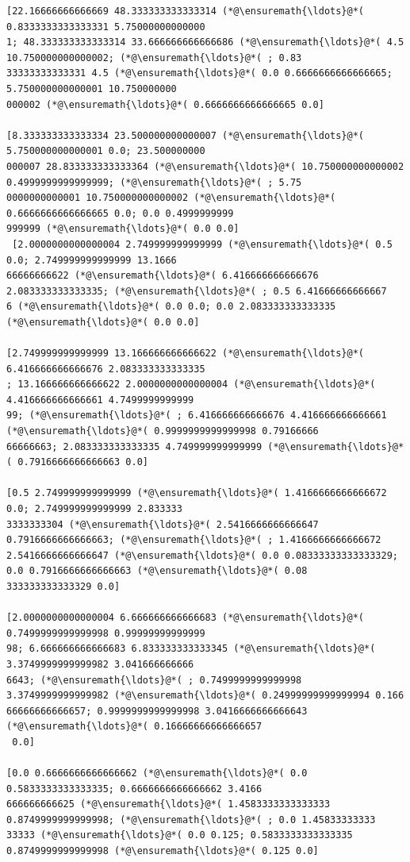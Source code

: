 \documentclass[12pt,a4paper]{article}
\begin{document}
\begin{lstlisting}
[22.16666666666669 48.333333333333314 (*@\ensuremath{\ldots}@*( 0.8333333333333331 5.75000000000000
1; 48.333333333333314 33.666666666666686 (*@\ensuremath{\ldots}@*( 4.5 10.750000000000002; (*@\ensuremath{\ldots}@*( ; 0.83
33333333333331 4.5 (*@\ensuremath{\ldots}@*( 0.0 0.6666666666666665; 5.750000000000001 10.750000000
000002 (*@\ensuremath{\ldots}@*( 0.6666666666666665 0.0]

[8.333333333333334 23.500000000000007 (*@\ensuremath{\ldots}@*( 5.750000000000001 0.0; 23.500000000
000007 28.833333333333364 (*@\ensuremath{\ldots}@*( 10.750000000000002 0.4999999999999999; (*@\ensuremath{\ldots}@*( ; 5.75
0000000000001 10.750000000000002 (*@\ensuremath{\ldots}@*( 0.6666666666666665 0.0; 0.0 0.4999999999
999999 (*@\ensuremath{\ldots}@*( 0.0 0.0]
 [2.0000000000000004 2.749999999999999 (*@\ensuremath{\ldots}@*( 0.5 0.0; 2.749999999999999 13.1666
66666666622 (*@\ensuremath{\ldots}@*( 6.416666666666676 2.083333333333335; (*@\ensuremath{\ldots}@*( ; 0.5 6.41666666666667
6 (*@\ensuremath{\ldots}@*( 0.0 0.0; 0.0 2.083333333333335 (*@\ensuremath{\ldots}@*( 0.0 0.0]

[2.749999999999999 13.166666666666622 (*@\ensuremath{\ldots}@*( 6.416666666666676 2.083333333333335
; 13.166666666666622 2.0000000000000004 (*@\ensuremath{\ldots}@*( 4.416666666666661 4.7499999999999
99; (*@\ensuremath{\ldots}@*( ; 6.416666666666676 4.416666666666661 (*@\ensuremath{\ldots}@*( 0.9999999999999998 0.79166666
66666663; 2.083333333333335 4.749999999999999 (*@\ensuremath{\ldots}@*( 0.7916666666666663 0.0]

[0.5 2.749999999999999 (*@\ensuremath{\ldots}@*( 1.4166666666666672 0.0; 2.749999999999999 2.833333
3333333304 (*@\ensuremath{\ldots}@*( 2.5416666666666647 0.7916666666666663; (*@\ensuremath{\ldots}@*( ; 1.4166666666666672 
2.5416666666666647 (*@\ensuremath{\ldots}@*( 0.0 0.08333333333333329; 0.0 0.7916666666666663 (*@\ensuremath{\ldots}@*( 0.08
333333333333329 0.0]

[2.0000000000000004 6.666666666666683 (*@\ensuremath{\ldots}@*( 0.7499999999999998 0.99999999999999
98; 6.666666666666683 6.833333333333345 (*@\ensuremath{\ldots}@*( 3.3749999999999982 3.041666666666
6643; (*@\ensuremath{\ldots}@*( ; 0.7499999999999998 3.3749999999999982 (*@\ensuremath{\ldots}@*( 0.24999999999999994 0.166
66666666666657; 0.9999999999999998 3.0416666666666643 (*@\ensuremath{\ldots}@*( 0.16666666666666657
 0.0]

[0.0 0.6666666666666662 (*@\ensuremath{\ldots}@*( 0.0 0.5833333333333335; 0.6666666666666662 3.4166
666666666625 (*@\ensuremath{\ldots}@*( 1.4583333333333333 0.8749999999999998; (*@\ensuremath{\ldots}@*( ; 0.0 1.45833333333
33333 (*@\ensuremath{\ldots}@*( 0.0 0.125; 0.5833333333333335 0.8749999999999998 (*@\ensuremath{\ldots}@*( 0.125 0.0]


\end{lstlisting}
\end{document}

